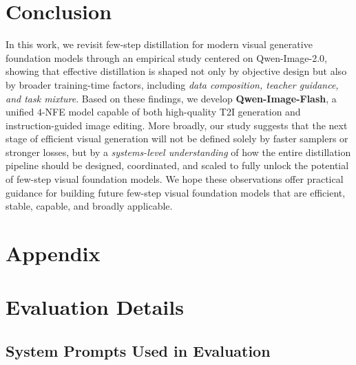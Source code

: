 \documentclass{llmxive}
\providecommand{\thefigure}{\Alph{figure}}
\providecommand{\thetable}{\Alph{table}}
\providecommand{\addcontentsline}[3]{}
\begin{document}
\section{Conclusion}
In this work, we revisit few-step distillation for modern visual generative foundation models through an empirical study centered on Qwen-Image-2.0, showing that effective distillation is shaped not only by objective design but also by broader training-time factors, including \textit{data composition, teacher guidance, and task mixture}. Based on these findings, we develop \textbf{Qwen-Image-Flash}, a unified $4$-NFE model capable of both high-quality T2I generation and instruction-guided image editing. More broadly, our study suggests that the next stage of efficient visual generation will not be defined solely by faster samplers or stronger losses, but by a \textit{systems-level understanding} of how the entire distillation pipeline should be designed, coordinated, and scaled to fully unlock the potential of few-step visual foundation models. We hope these observations offer practical guidance for building future few-step visual foundation models that are efficient, stable, capable, and broadly applicable.





\addcontentsline{toc}{section}{References}



\appendix

\addcontentsline{toc}{section}{Appendix}
\section*{Appendix}

\renewcommand{\thefigure}{\Alph{figure}}
\renewcommand{\thetable}{\Alph{table}}
\setcounter{figure}{0}
\setcounter{table}{0}

\section{Evaluation Details}
\label{app:evaluation_details}

\subsection{System Prompts Used in Evaluation}
\label{app:system_prompts}
\end{document}
